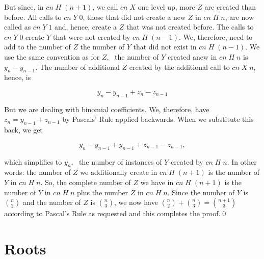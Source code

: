 \documentclass[tikz]{scrreprt}
\newcommand{\Conid}[1]{\mathit{#1}}
\newcommand{\Varid}[1]{\mathit{#1}}
\begin{document}
But since, in \ensuremath{\Varid{cn}\;\Conid{H}\;(\Varid{n}\mathbin{+}\mathrm{1})}, we call \ensuremath{\Varid{cn}\;\Conid{X}} one level up,
more \ensuremath{\Conid{Z}} are created than before.
All calls to \ensuremath{\Varid{cn}\;\Conid{Y}\;\mathrm{0}}, those that did not create a new \ensuremath{\Conid{Z}}
in \ensuremath{\Varid{cn}\;\Conid{H}\;\Varid{n}},
are now called as \ensuremath{\Varid{cn}\;\Conid{Y}\;\mathrm{1}} and, hence, create a \ensuremath{\Conid{Z}}
that was not created before. The calls to \ensuremath{\Varid{cn}\;\Conid{Y}\;\mathrm{0}} create
\ensuremath{\Conid{Y}} that were not created by \ensuremath{\Varid{cn}\;\Conid{H}\;(\Varid{n}\mathbin{-}\mathrm{1})}.
We, therefore, need to add to the number of \ensuremath{\Conid{Z}} the number
of \ensuremath{\Conid{Y}} that did not exist in \ensuremath{\Varid{cn}\;\Conid{H}\;(\Varid{n}\mathbin{-}\mathrm{1})}.
We use the same convention as for \ensuremath{\Conid{Z}}, \ie\
the  number of \ensuremath{\Conid{Y}} created anew in \ensuremath{\Varid{cn}\;\Conid{H}\;\Varid{n}} is
$y_n - y_{n-1}$.
The number of additional \ensuremath{\Conid{Z}} 
created by the additional call to 
\ensuremath{\Varid{cn}\;\Conid{X}\;\Varid{n}}, hence, is

\[
y_n - y_{n-1} + z_n - z_{n-1}
\]

But we are dealing with binomial coefficients.
We, therefore, have $z_n = y_{n-1} + z_{n-1}$
by Pascals' Rule applied backwards.
When we substitute this back, we get

\[
y_n - y_{n-1} + y_{n-1} + z_{n-1} - z_{n-1},
\]

which simplifies to $y_n$, \ie\ the number of 
instances of \ensuremath{\Conid{Y}} created by \ensuremath{\Varid{cn}\;\Conid{H}\;\Varid{n}}.
In other words: the number of \ensuremath{\Conid{Z}} we 
additionally create in \ensuremath{\Varid{cn}\;\Conid{H}\;(\Varid{n}\mathbin{+}\mathrm{1})} is the number
of \ensuremath{\Conid{Y}} in \ensuremath{\Varid{cn}\;\Conid{H}\;\Varid{n}}.
So, the complete number of \ensuremath{\Conid{Z}} we have 
in \ensuremath{\Varid{cn}\;\Conid{H}\;(\Varid{n}\mathbin{+}\mathrm{1})} is
the number of \ensuremath{\Conid{Y}} in \ensuremath{\Varid{cn}\;\Conid{H}\;\Varid{n}} 
plus the number \ensuremath{\Conid{Z}} in \ensuremath{\Varid{cn}\;\Conid{H}\;\Varid{n}}.
Since the number of \ensuremath{\Conid{Y}} is $\binom{n}{2}$
and the number of \ensuremath{\Conid{Z}} is  $\binom{n}{3}$,
we now have 
$\binom{n}{2} + \binom{n}{3} = \binom{n+1}{3}$ 
according to Pascal's Rule as requested
and this completes the proof.\qed
\section{Roots}
\end{document}

